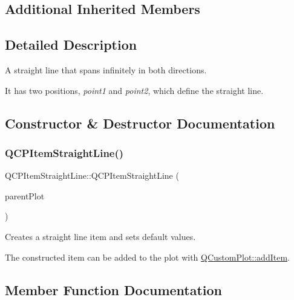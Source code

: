 \subsection*{Additional Inherited Members}


\subsection{Detailed Description}
A straight line that spans infinitely in both directions. 

 It has two positions, {\itshape point1} and {\itshape point2}, which define the straight line. 

\subsection{Constructor \& Destructor Documentation}
\hypertarget{class_q_c_p_item_straight_line_a41fd2e1f006983449eca9830930c3b10}{}\label{class_q_c_p_item_straight_line_a41fd2e1f006983449eca9830930c3b10} 
\subsubsection{\texorpdfstring{Q\+C\+P\+Item\+Straight\+Line()}{QCPItemStraightLine()}}
{\footnotesize\ttfamily Q\+C\+P\+Item\+Straight\+Line\+::\+Q\+C\+P\+Item\+Straight\+Line (\begin{DoxyParamCaption}\item[{\hyperlink{class_q_custom_plot}{Q\+Custom\+Plot} $\ast$}]{parent\+Plot }\end{DoxyParamCaption})}

Creates a straight line item and sets default values.

The constructed item can be added to the plot with \hyperlink{class_q_custom_plot_aa500620379262321685cb7a7674cbd2a}{Q\+Custom\+Plot\+::add\+Item}. 

\subsection{Member Function Documentation}
\hypertarget{class_q_c_p_item_straight_line_a1e5d99d79efb5871600c72bcd2891a0f}{}\label{class_q_c_p_item_straight_line_a1e5d99d79efb5871600c72bcd2891a0f} 
